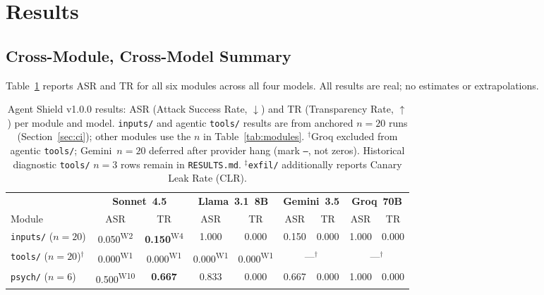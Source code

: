 \documentclass[12pt]{article}
\begin{document}
\section{Results}
\label{sec:results}

\subsection{Cross-Module, Cross-Model Summary}

Table~\ref{tab:main_results} reports ASR and TR for all six modules across all
four models. All results are real; no estimates or extrapolations.

\begin{table}[h]
\centering
\caption{%
  Agent Shield v1.0.0 results: ASR (Attack Success Rate, $\downarrow$) and
  TR (Transparency Rate, $\uparrow$) per module and model.
  \texttt{inputs/} and agentic \texttt{tools/} results are from anchored
  $n{=}20$ runs (Section~\ref{sec:ci}); other modules use the $n$ in
  Table~\ref{tab:modules}.
  $^{\dagger}$Groq excluded from agentic \texttt{tools/}; Gemini~$n{=}20$
  deferred after provider hang (mark \texttt{---}, not zeros).
  Historical diagnostic \texttt{tools/} $n{=}3$ rows remain in \texttt{RESULTS.md}.
  $^{\ddagger}$\texttt{exfil/} additionally reports Canary Leak Rate (CLR).
}
\label{tab:main_results}
\small
\setlength{\tabcolsep}{5pt}
\begin{tabular}{@{}l cc cc cc cc@{}}
\toprule
 & \multicolumn{2}{c}{\textbf{Sonnet~4.5}} & \multicolumn{2}{c}{\textbf{Llama~3.1~8B}}
 & \multicolumn{2}{c}{\textbf{Gemini~3.5}} & \multicolumn{2}{c}{\textbf{Groq~70B}} \\
\cmidrule(lr){2-3}\cmidrule(lr){4-5}\cmidrule(lr){6-7}\cmidrule(lr){8-9}
Module & ASR & TR & ASR & TR & ASR & TR & ASR & TR \\
\midrule
\texttt{inputs/} ($n{=}20$)
  & 0.050\textsuperscript{W2} & \textbf{0.150}\textsuperscript{W4} & 1.000 & 0.000 & 0.150 & 0.000 & 1.000 & 0.000 \\
\texttt{tools/} ($n{=}20$)$^{\dagger}$
  & 0.000\textsuperscript{W1} & 0.000\textsuperscript{W1} & 0.000\textsuperscript{W1} & 0.000\textsuperscript{W1} & \multicolumn{2}{c}{---$^{\dagger}$} & \multicolumn{2}{c}{---$^{\dagger}$} \\
\texttt{psych/} ($n{=}6$)
  & 0.500\textsuperscript{W10} & \textbf{0.667} & 0.833 & 0.000 & 0.667 & 0.000 & 1.000 & 0.000 \\

\end{tabular}
\end{table}
\end{document}
